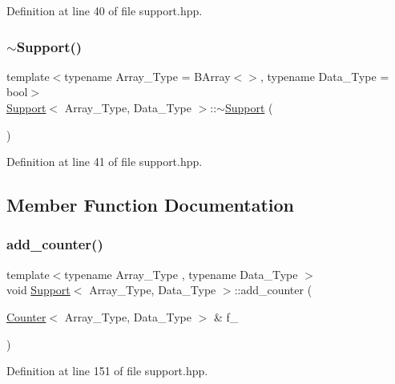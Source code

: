 Definition at line 40 of file support.\+hpp.

\mbox{\label{class_support_a03228371869980fa356b7b86871d94e8}} 
\subsubsection{\texorpdfstring{$\sim$\+Support()}{~Support()}}
{\footnotesize\ttfamily template$<$typename Array\+\_\+\+Type  = B\+Array$<$$>$, typename Data\+\_\+\+Type  = bool$>$ \\
\hyperlink{class_support}{Support}$<$ Array\+\_\+\+Type, Data\+\_\+\+Type $>$\+::$\sim$\hyperlink{class_support}{Support} (\begin{DoxyParamCaption}{ }\end{DoxyParamCaption})\hspace{0.3cm}{\ttfamily [inline]}}



Definition at line 41 of file support.\+hpp.



\subsection{Member Function Documentation}
\mbox{\label{class_support_a9fc89bd8b15dcad6a4140a3c74073d10}} 
\subsubsection{\texorpdfstring{add\+\_\+counter()}{add\_counter()}}
{\footnotesize\ttfamily template$<$typename Array\+\_\+\+Type , typename Data\+\_\+\+Type $>$ \\
void \hyperlink{class_support}{Support}$<$ Array\+\_\+\+Type, Data\+\_\+\+Type $>$\+::add\+\_\+counter (\begin{DoxyParamCaption}\item[{\hyperlink{class_counter}{Counter}$<$ Array\+\_\+\+Type, Data\+\_\+\+Type $>$ \&}]{f\+\_\+ }\end{DoxyParamCaption})\hspace{0.3cm}{\ttfamily [inline]}}



Definition at line 151 of file support.\+hpp.

